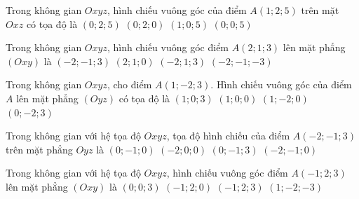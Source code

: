 

\begin{ex}%
	Trong không gian $Oxyz$, hình chiếu vuông  góc của điểm $A(1;2;5)$ trên mặt $Oxz$ có tọa độ là
	\choice 
		 {$(0;2;5)$}
		 {$(0;2;0)$}
		{\True $(1;0;5)$} 
		 {$(0;0;5)$}
\end{ex}

\begin{ex}%
	Trong không gian $Oxyz$, hình chiếu vuông góc điểm $A(2;1;3)$ lên mặt phẳng $(Oxy)$ là 
	 \choice
		 {$(-2;-1;3)$}
		 {\True $(2;1;0)$}
		{$(-2;1;3)$} 
		{$(-2;-1;-3)$} 
\end{ex}

\begin{ex}%
	Trong không gian $Oxyz$, cho điểm $A(1;-2;3)$. Hình chiếu vuông góc của điểm $A$ lên mặt phẳng $(Oyz)$  có tọa độ là
	\choice 
		{$(1;0;3)$} 
		 {$(1;0;0)$}
		 {$(1;-2;0)$}
		{\True  $(0;-2;3)$}
\end{ex}

\begin{ex}%
	Trong không gian với hệ tọa độ $Oxyz$, tọa độ  hình chiếu của điểm $A(-2;-1;3)$ trên mặt phẳng $Oyz$ là
	 \choice
		{$(0;-1;0)$} 
		{$(-2;0;0)$} 
		{\True $(0;-1;3)$} 
		 {$(-2;-1;0)$}
\end{ex}

\begin{ex}%
	Trong không gian với hệ tọa độ $Oxyz$, hình chiếu vuông  góc điểm $A(-1;2;3)$ lên mặt phẳng $(Oxy)$ là
	 \choice
		{$(0;0;3)$} 
		{\True$(-1;2;0)$} 
		 {$(-1;2;3)$}
		 {$(1;-2;-3)$}
\end{ex}

